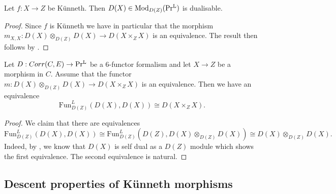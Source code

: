 \begin{corollary}\label{Künnethmorphismimplies dualisable}
    Let $f: X\to Z$ be Künneth. Then $D(X)\in \operatorname{Mod}_{D(Z)}(\operatorname{Pr^{L}})$ is dualisable.
\end{corollary}
\begin{proof}
    Since $f$ is Künneth we have in particular that the morphism $m_{X,X}: D(X)\otimes_{D(Z)}D(X) \to D(X\times_Z X)$ is an equivalence. The result then follows  by .
\end{proof}

\begin{corollary}\label{generalequivalence is given by a kernel}
Let $D : Corr(C,E) \to \operatorname{Pr^{L}}$ be a $6$-functor formalism  and let $X \to Z$ be a morphism in $C$. Assume that the functor $m: D(X)\otimes_{D(Z)}D(X) \to D(X\times_Z X)$ is an equivalence. Then we have an equivalence 
\[
\mathrm{Fun}_{D(Z)}^{L}(D(X),D(X))\cong D(X \times_Z X).
\]
 \end{corollary}
 \begin{proof}
We claim that there are equivalences
 \[
  \mathrm{Fun}_{D(Z)}^{L}(D(X),D(X))\cong  \mathrm{Fun}_{D(Z)}^{L}(D(Z), D(X)\otimes_{D(Z)} D(X))\cong D(X)\otimes_{D(Z)} D(X).
 \]
Indeed, by , we know that $D(X)$ is self dual as a $D(Z)$ module which shows the first equivalence. The second equivalence is natural.
 \end{proof}

\subsection{Descent properties of Künneth morphisms}\label{Properties of Künneth morphisms}
 

